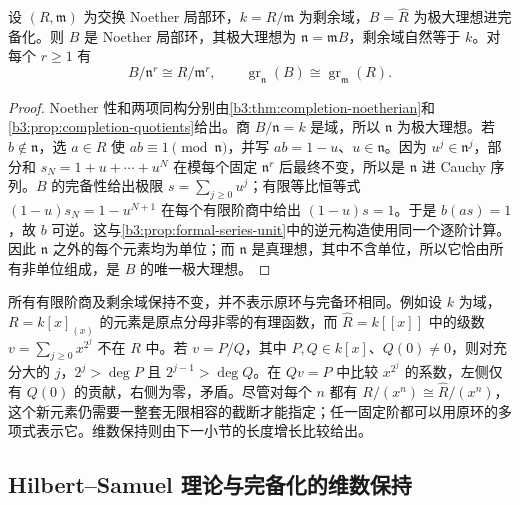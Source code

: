 \begin{proposition}\label{b3:prop:completed-local-ring}
	设 \((R,\mathfrak m)\) 为交换 Noether 局部环，\(k=R/\mathfrak m\) 为剩余域，\(B=\widehat R\) 为极大理想进完备化。则 \(B\) 是 Noether 局部环，其极大理想为 \(\mathfrak n=\mathfrak mB\)，剩余域自然等于 \(k\)。对每个 \(r\ge1\) 有
	\[
		B/\mathfrak n^r\cong R/\mathfrak m^r, \qquad \operatorname{gr}_{\mathfrak n}(B)\cong\operatorname{gr}_{\mathfrak m}(R).
	\]
\end{proposition}
\begin{proof}
	Noether 性和两项同构分别由\cref{b3:thm:completion-noetherian}和\cref{b3:prop:completion-quotients}给出。商 \(B/\mathfrak n=k\) 是域，所以 \(\mathfrak n\) 为极大理想。若 \(b\notin\mathfrak n\)，选 \(a\in R\) 使 \(ab\equiv1\pmod{\mathfrak n}\)，并写 \(ab=1-u\)、\(u\in\mathfrak n\)。因为 \(u^j\in\mathfrak n^j\)，部分和 \(s_N=1+u+\cdots+u^N\) 在模每个固定 \(\mathfrak n^r\) 后最终不变，所以是 \(\mathfrak n\) 进 Cauchy 序列。\(B\) 的完备性给出极限 \(s=\sum_{j\ge0}u^j\)；有限等比恒等式 \((1-u)s_N=1-u^{N+1}\) 在每个有限阶商中给出 \((1-u)s=1\)。于是 \(b(as)=1\)，故 \(b\) 可逆。这与\cref{b3:prop:formal-series-unit}中的逆元构造使用同一个逐阶计算。因此 \(\mathfrak n\) 之外的每个元素均为单位；而 \(\mathfrak n\) 是真理想，其中不含单位，所以它恰由所有非单位组成，是 \(B\) 的唯一极大理想。
\end{proof}

所有有限阶商及剩余域保持不变，并不表示原环与完备环相同。例如设 \(k\) 为域，\(R=k[x]_{(x)}\) 的元素是原点分母非零的有理函数，而 \(\widehat R=k[\![x]\!]\) 中的级数 \(v=\sum_{j\ge0}x^{2^j}\) 不在 \(R\) 中。若 \(v=P/Q\)，其中 \(P,Q\in k[x]\)、\(Q(0)\ne0\)，则对充分大的 \(j\)，\(2^j>\deg P\) 且 \(2^{j-1}>\deg Q\)。在 \(Qv=P\) 中比较 \(x^{2^j}\) 的系数，左侧仅有 \(Q(0)\) 的贡献，右侧为零，矛盾。尽管对每个 \(n\) 都有 \(R/(x^n)\cong\widehat R/(x^n)\)，这个新元素仍需要一整套无限相容的截断才能指定；任一固定阶都可以用原环的多项式表示它。维数保持则由下一小节的长度增长比较给出。

\subsection{Hilbert–Samuel 理论与完备化的维数保持}
\label{b3:subsec:1304:05}

